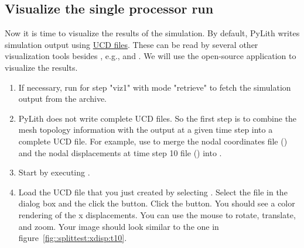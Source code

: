 \subsection{Visualize the single processor run}

Now it is time to visualize the results of the simulation. By default,
PyLith writes simulation output using \href{http://help.avs.com/Express/doc/help/reference/dvmac/UCD\_Form.htm}{ UCD
  files}.
These can be read by several other visualization tools besides
, e.g.,  and . We will use the open-source application
 to visualize the results.
    
\begin{enumerate}
\item If necessary, run  for step "viz1" with mode
  "retrieve" to fetch the simulation output from the archive.

  \begin{screen}
    \shellprompt{}
  \end{screen}
  
\item PyLith does not write complete UCD files. So the first step is
  to combine the mesh topology information with the output at a given
  time step into a complete UCD file. For example, use 
  to merge the nodal coordinates file
  () and the nodal displacements at
  time step 10 file () into
  .

  \begin{screen}
    \shellprompt{}
\end{screen}

\item Start  by executing .

  \begin{screen}
    \shellprompt{}
  \end{screen}
  
\item Load the UCD file that you just created by selecting
  \guiselect{}. Select the file in
  the dialog box and the click the  button. Click the
   button. You should see a color rendering of the x
  displacements. You can use the mouse to rotate, translate, and zoom.
  Your image should look similar to the one in
  figure~\ref{fig::splittest:xdisp:t10}.
        

\end{enumerate}
